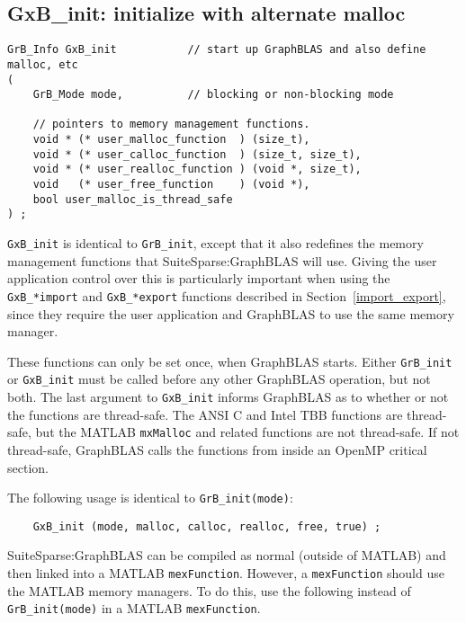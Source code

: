 \documentclass[12pt]{article}
\begin{document}
\subsection{{\sf GxB\_init:} initialize with alternate malloc} %
\label{xinit}

\begin{mdframed}[userdefinedwidth=6in]
{\footnotesize
\begin{verbatim}
GrB_Info GxB_init           // start up GraphBLAS and also define malloc, etc
(
    GrB_Mode mode,          // blocking or non-blocking mode

    // pointers to memory management functions.
    void * (* user_malloc_function  ) (size_t),
    void * (* user_calloc_function  ) (size_t, size_t),
    void * (* user_realloc_function ) (void *, size_t),
    void   (* user_free_function    ) (void *),
    bool user_malloc_is_thread_safe
) ;
\end{verbatim}
}\end{mdframed}

\verb'GxB_init' is identical to \verb'GrB_init', except that it also redefines
the memory management functions that SuiteSparse:GraphBLAS will use.  Giving
the user application control over this is particularly important when using the
\verb'GxB_*import' and \verb'GxB_*export' functions described in
Section~\ref{import_export}, since they require the user application and
GraphBLAS to use the same memory manager.

These
functions can only be set once, when GraphBLAS starts.   Either \verb'GrB_init'
or \verb'GxB_init' must be called before any other GraphBLAS operation, but
not both.  The last argument to \verb'GxB_init' informs GraphBLAS as to
whether or not the functions are thread-safe.  The ANSI C and Intel TBB
functions are thread-safe, but the MATLAB \verb'mxMalloc' and related
functions are not thread-safe.  If not thread-safe, GraphBLAS calls
the functions from inside an OpenMP critical section.

The following usage is identical to \verb'GrB_init(mode)':

    {\footnotesize
    \begin{verbatim}
    GxB_init (mode, malloc, calloc, realloc, free, true) ; \end{verbatim}}

SuiteSparse:GraphBLAS can be compiled as normal (outside of MATLAB) and then
linked into a MATLAB \verb'mexFunction'.  However, a \verb'mexFunction' should
use the MATLAB memory managers.  To do this, use the following instead of
\verb'GrB_init(mode)' in a MATLAB \verb'mexFunction'.
\end{document}
